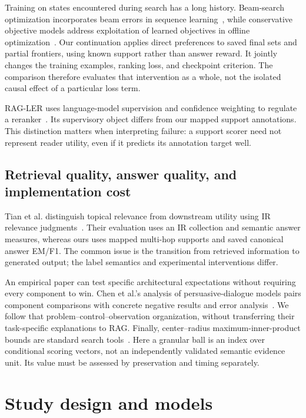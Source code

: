 \documentclass[preprint,12pt]{elsarticle}
\begin{document}
Training on states encountered during search has a long history. Beam-search optimization incorporates beam errors in sequence learning~\cite{wiseman2016bso}, while conservative objective models address exploitation of learned objectives in offline optimization~\cite{trabucco2021com}. Our continuation applies direct preferences to saved final sets and partial frontiers, using known support rather than answer reward. It jointly changes the training examples, ranking loss, and checkpoint criterion. The comparison therefore evaluates that intervention as a whole, not the isolated causal effect of a particular loss term.

RAG-LER uses language-model supervision and confidence weighting to regulate a reranker~\cite{zhai2025ragler}. Its supervisory object differs from our mapped support annotations. This distinction matters when interpreting failure: a support scorer need not represent reader utility, even if it predicts its annotation target well.

\subsection{Retrieval quality, answer quality, and implementation cost}
Tian et al. distinguish topical relevance from downstream utility using IR relevance judgments~\cite{tian2025relevance}. Their evaluation uses an IR collection and semantic answer measures, whereas ours uses mapped multi-hop supports and saved canonical answer EM/F1. The common issue is the transition from retrieved information to generated output; the label semantics and experimental interventions differ.

An empirical paper can test specific architectural expectations without requiring every component to win. Chen et al.'s analysis of persuasive-dialogue models pairs component comparisons with concrete negative results and error analysis~\cite{chen2021persuasive}. We follow that problem--control--observation organization, without transferring their task-specific explanations to RAG. Finally, center--radius maximum-inner-product bounds are standard search tools~\cite{ram2012tree}. Here a granular ball is an index over conditional scoring vectors, not an independently validated semantic evidence unit. Its value must be assessed by preservation and timing separately.

\section{Study design and models}
\end{document}
